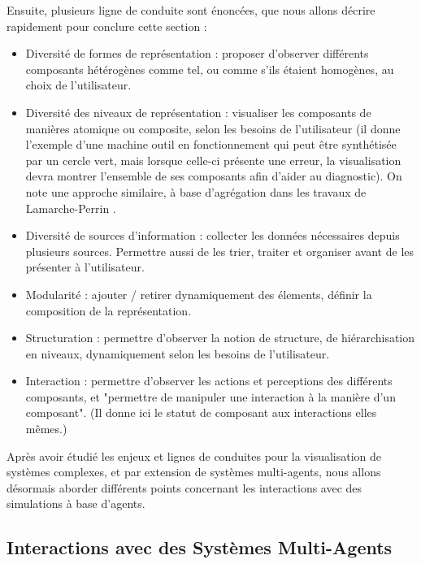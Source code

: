 		Ensuite, plusieurs ligne de conduite sont énoncées, que nous allons décrire rapidement pour conclure cette section :
		\begin{itemize}
			\item Diversité de formes de représentation : proposer d'observer différents composants hétérogènes comme tel, ou comme s'ils étaient homogènes, au choix de l'utilisateur.
			\item Diversité des niveaux de représentation : visualiser les composants de manières atomique ou composite, selon les besoins de l'utilisateur (il donne l'exemple d'une machine outil en fonctionnement qui peut être synthétisée par un cercle vert, mais lorsque celle-ci présente une erreur, la visualisation devra montrer l'ensemble de ses composants afin d'aider au diagnostic). On note une approche similaire, à base d'agrégation dans les travaux de Lamarche-Perrin \cite{lamarche-perrin_analyse_2013}.
			\item Diversité de sources d'information : collecter les données nécessaires depuis plusieurs sources. Permettre aussi de les trier, traiter et organiser avant de les présenter à l'utilisateur.
			\item Modularité : ajouter / retirer dynamiquement des élements, définir la composition de la représentation.
			\item Structuration : permettre d'observer la notion de structure, de hiérarchisation en niveaux, dynamiquement selon les besoins de l'utilisateur.
			\item Interaction : permettre d'observer les actions et perceptions des différents composants, et "permettre de manipuler une interaction à la manière d'un composant". (Il donne ici le statut de composant aux interactions elles mêmes.)
		\end{itemize}
		
		Après avoir étudié les enjeux et lignes de conduites pour la visualisation de systèmes complexes, et par extension de systèmes multi-agents, nous allons désormais aborder différents points concernant les interactions avec des simulations à base d'agents.
		
		\subsection{Interactions avec des Systèmes Multi-Agents}
	
